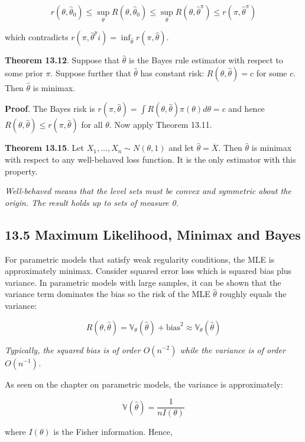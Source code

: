 \[r(\theta, \hat{\theta}_0) \leq \sup_\theta R(\theta, \hat{\theta}_0) \leq \sup_\theta R(\theta, \hat{\theta}^\pi) \leq r(\pi, \hat{\theta}^\pi)\]

which contradicts
\(r(\pi, \hat{\theta}^pi) = \inf_{\hat{\theta}} r(\pi, \hat{\theta})\).

\textbf{Theorem 13.12}. Suppose that \(\hat{\theta}\) is the Bayes rule
estimator with respect to some prior \(\pi\). Suppose further that
\(\hat{\theta}\) has constant risk: \(R(\theta, \hat{\theta}) = c\) for
some \(c\). Then \(\hat{\theta}\) is minimax.

\textbf{Proof}. The Bayes risk is
\(r(\pi, \hat{\theta}) = \int R(\theta, \hat{\theta}) \pi(\theta) d\theta = c\)
and hence \(R(\theta, \hat{\theta}) \leq r(\pi, \hat{\theta})\) for all
\(\theta\). Now apply Theorem 13.11.

\textbf{Theorem 13.15}. Let \(X_1, \dots, X_n \sim N(\theta, 1)\) and
let \(\hat{\theta} = \overline{X}\). Then \(\hat{\theta}\) is minimax
with respect to any well-behaved loss function. It is the only estimator
with this property.

\emph{Well-behaved means that the level sets must be convex and
symmetric about the origin. The result holds up to sets of measure 0.}

\subsection{13.5 Maximum Likelihood, Minimax and
Bayes}\label{maximum-likelihood-minimax-and-bayes}

For parametric models that satisfy weak regularity conditions, the MLE
is approximately minimax. Consider squared error loss which is squared
bias plus variance. In parametric models with large samples, it can be
shown that the variance term dominates the bias so the risk of the MLE
\(\hat{\theta}\) roughly equals the variance:

\[R(\theta, \hat{\theta}) = \mathbb{V}_\theta(\hat{\theta}) + \text{bias}^2 \approx \mathbb{V}_\theta(\hat{\theta})\]

\emph{Typically, the squared bias is of order \(O(n^{-2})\) while the
variance is of order \(O(n^{-1})\).}

As seen on the chapter on parametric models, the variance is
approximately:

\[\mathbb{V}(\hat{\theta}) = \frac{1}{nI(\theta)}\]

where \(I(\theta)\) is the Fisher information. Hence,

